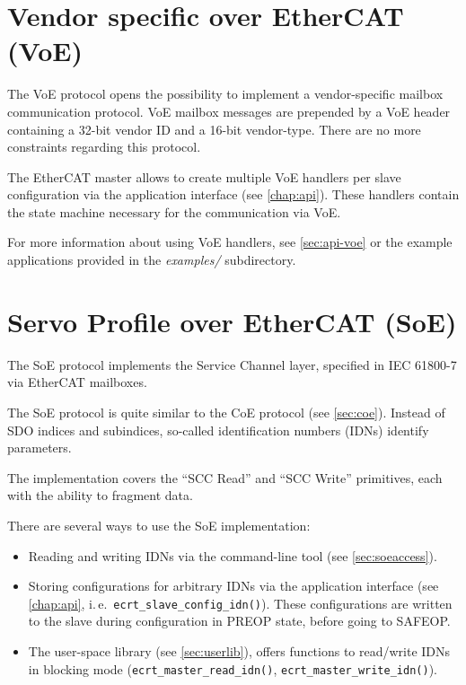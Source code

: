 \documentclass[a4paper,12pt,BCOR6mm,bibtotoc,idxtotoc]{scrbook}
\begin{document}

\section{Vendor specific over EtherCAT (VoE)}
\label{sec:voe}

The VoE protocol opens the possibility to implement a vendor-specific mailbox
communication protocol. VoE mailbox messages are prepended by a VoE header
containing a 32-bit vendor ID and a 16-bit vendor-type. There are no more
constraints regarding this protocol.

The EtherCAT master allows to create multiple VoE handlers per slave
configuration via the application interface (see \autoref{chap:api}). These
handlers contain the state machine necessary for the communication via VoE.

For more information about using VoE handlers, see \autoref{sec:api-voe} or
the example applications provided in the \textit{examples/} subdirectory.


\section{Servo Profile over EtherCAT (SoE)}
\label{sec:soe}

The SoE protocol implements the Service Channel layer, specified in IEC
61800-7 \cite{soespec} via EtherCAT mailboxes.

The SoE protocol is quite similar to the CoE protocol (see
\autoref{sec:coe}). Instead of SDO indices and subindices, so-called
identification numbers (IDNs) identify parameters.

The implementation covers the ``SCC Read'' and ``SCC Write'' primitives, each
with the ability to fragment data.

There are several ways to use the SoE implementation:

\begin{itemize}

\item Reading and writing IDNs via the command-line tool (see
\autoref{sec:soeaccess}).

\item Storing configurations for arbitrary IDNs via the application interface
(see \autoref{chap:api}, i.\,e.~\lstinline+ecrt_slave_config_idn()+). These
configurations are written to the slave during configuration in PREOP state,
before going to SAFEOP.

\item The user-space library (see \autoref{sec:userlib}), offers functions to
read/write IDNs in blocking mode (\lstinline+ecrt_master_read_idn()+,
\lstinline+ecrt_master_write_idn()+).

\end{itemize}
\end{document}
